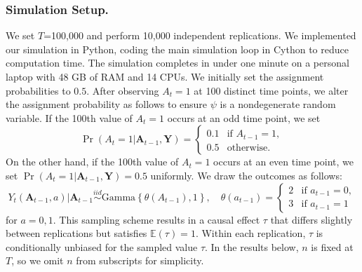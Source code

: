 \documentclass[11pt]{article}
\renewcommand\vec[1]{\boldsymbol{#1}}
\newcommand\mat[1]{\mathbf{#1}}
\newcommand{\E}{\mathbb{E}}
\theoremstyle{definition}
\begin{document}
\subsubsection{Simulation Setup.}\label{sec:simulation-setup}
We set $T$=100,000 and perform 10,000 independent replications.
We implemented our simulation in Python, coding the main simulation loop in Cython \citep{behnel2010cython} to reduce computation time.
The simulation completes in under one minute on a personal laptop with 48 GB of RAM and 14 CPUs.
We initially set the assignment probabilities to $0.5$.
After observing $A_t = 1$ at 100 distinct time points, we alter the assignment probability as follows to ensure $\psi$ is a nondegenerate random variable.
If the 100th value of $A_t=1$ occurs at an odd time point, we set
\[
    \Pr(A_t = 1 | \vec{A}_{t-1}, \mat{Y})
    = \begin{cases}
        0.1 & \text{if } A_{t-1} = 1,\\
        0.5 & \text{otherwise}.
    \end{cases}
\]
On the other hand, if the 100th value of $A_t=1$ occurs at an even time point, we set $\Pr(A_t = 1 | \vec{A}_{t-1}, \mat{Y}) = 0.5$ uniformly.
We draw the outcomes as follows:
\[
    Y_t(\vec{A}_{t-1}, a) | \vec{A}_{t-1}  \overset{iid}{\sim} \text{Gamma}\left\{\theta(A_{t-1}), 1\right\},
    \quad \theta(a_{t-1}) = \begin{cases}
        2 & \text{if } a_{t-1} = 0,\\
        3 & \text{if } a_{t-1} = 1
    \end{cases}
\]
for $a = 0, 1$.
This sampling scheme results in a causal effect $\tau$ that differs slightly between replications but satisfies $\E(\tau) = 1$.
Within each replication, $\hat{\tau}$ is conditionally unbiased for the sampled value $\tau$.
In the results below, $n$ is fixed at $T$, so we omit $n$ from subscripts for simplicity.
\end{document}
